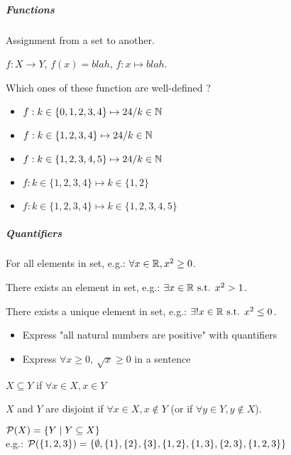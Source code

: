 \subparagraph{Functions}
\begin{definition}[Functions]
    Assignment from a set to another.
\end{definition}
\begin{notation}[Function]
    $f: X \to Y$, $f(x)=blah$, $f: x \mapsto blah$.
\end{notation}
\begin{question}
    Which ones of these function are well-defined ?
    \begin{itemize}
        \item $f:k\in \{0,1,2,3,4\}\mapsto 24/k\in \mathbb{N}$
        \item $f:k\in \{1,2,3,4\}\mapsto 24/k\in \mathbb{N}$
        \item $f:k\in \{1,2,3,4,5\}\mapsto 24/k\in \mathbb{N}$
        \item $f:k\in \{1,2,3,4\}\mapsto k\in \{1,2\}$
        \item $f:k\in \{1,2,3,4\}\mapsto k\in \{1,2,3,4,5\}$
    \end{itemize}
\end{question}

\subparagraph{Quantifiers}
\begin{notation}[$\forall$]
    For all elements in set, e.g.: $\forall x \in \mathbb{R}, x^2 \geq 0$.
\end{notation}
\begin{notation}[$\exists$]
    There exists an element in set, e.g.: $\exists x \in \mathbb{R} \text{ s.t. } x^2 > 1$.
\end{notation}
\begin{notation}[$\exists !$]
    There exists a unique element in set, e.g.: $\exists ! x \in \mathbb{R} \text{ s.t. } x^2 \leq 0$.
\end{notation}
\begin{question}
    \begin{itemize}
        \item Express "all natural numbers are positive" with quantifiers
        \item Express $\forall x \geq 0, \ \sqrt{x} \geq 0$ in a sentence
    \end{itemize}
\end{question}
\begin{definition}
    $X \subseteq Y$ if $\forall x \in X, x \in Y$
\end{definition}
\begin{definition}
    $X$ and $Y$ are disjoint if $\forall x \in X, x \not\in Y$ (or if $\forall y \in Y, y \not\in X$).
\end{definition}
\begin{definition}
    $\mathcal{P}(X) = \{ Y \mid Y \subseteq X \}$\\
    e.g.: $\mathcal{P}(\{1,2,3\})=\{ \emptyset, \{1\},\{2\},\{3\}, \{1,2\},\{1,3\},\{2,3\}, \{1,2,3\} \}$
\end{definition}

